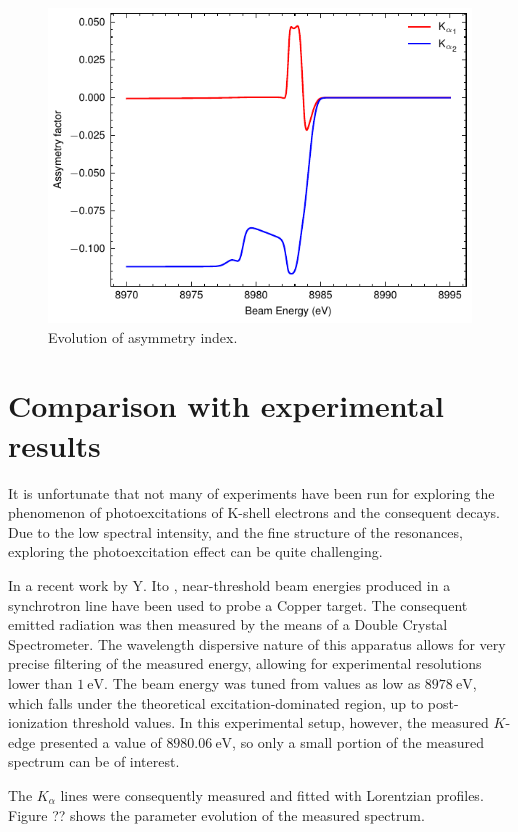 \begin{figure}
    \centering
    \includegraphics[width=.6\linewidth]{Chapters/Figures/Chapter5/assym_index.pdf}
    \caption{Evolution of asymmetry index.}\label{fig:index}
\end{figure}




\section{Comparison with experimental results}

It is unfortunate that not many of experiments have been run for exploring the phenomenon of photoexcitations of K-shell electrons and the consequent decays. Due to the low spectral intensity, and the fine structure of the resonances, exploring the photoexcitation effect can be quite challenging.

In a recent work by Y. Ito , near-threshold beam energies produced in a synchrotron line have been used to probe a Copper target. The consequent emitted radiation was then measured by the means of a Double Crystal Spectrometer. The wavelength dispersive nature of this apparatus allows for very precise filtering of the measured energy, allowing for experimental resolutions lower than $1\ \si{\electronvolt}$. The beam energy was tuned from values as low as $8978\ \si{\electronvolt}$, which falls under the theoretical excitation-dominated region, up to post-ionization threshold values. In this experimental setup, however, the measured $K$-edge presented a value of $8980.06\ \si{\electronvolt}$, so only a small portion of the measured spectrum can be of interest.

The $K_{\alpha}$ lines were consequently measured and fitted with Lorentzian profiles. Figure ?? shows the parameter evolution of the measured spectrum.


